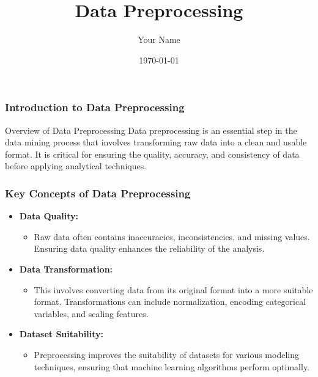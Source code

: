 \documentclass{beamer}
\title{Data Preprocessing}
\author{Your Name}
\institute{Your Institution}
\date{\today}
\begin{document}
\frame{\titlepage}

\begin{frame}[fragile]
    \frametitle{Introduction to Data Preprocessing}
    \begin{block}{Overview of Data Preprocessing}
        Data preprocessing is an essential step in the data mining process that involves transforming raw data into a clean and usable format. It is critical for ensuring the quality, accuracy, and consistency of data before applying analytical techniques.
    \end{block}
\end{frame}

\begin{frame}[fragile]
    \frametitle{Key Concepts of Data Preprocessing}
    \begin{itemize}
        \item \textbf{Data Quality:}
        \begin{itemize}
            \item Raw data often contains inaccuracies, inconsistencies, and missing values. Ensuring data quality enhances the reliability of the analysis.
        \end{itemize}
        
        \item \textbf{Data Transformation:}
        \begin{itemize}
            \item This involves converting data from its original format into a more suitable format. Transformations can include normalization, encoding categorical variables, and scaling features.
        \end{itemize}

        \item \textbf{Dataset Suitability:}
        \begin{itemize}
            \item Preprocessing improves the suitability of datasets for various modeling techniques, ensuring that machine learning algorithms perform optimally.
        \end{itemize}
    \end{itemize}
\end{frame}
\end{document}
